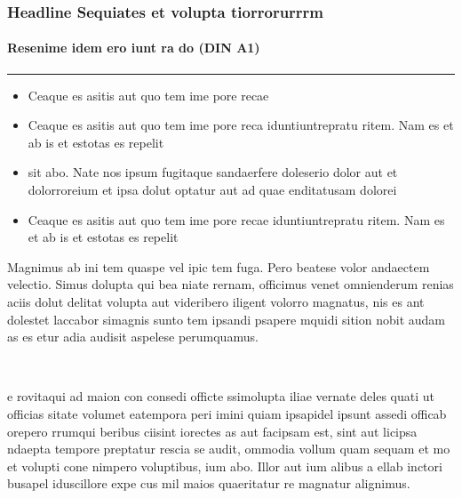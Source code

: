 \documentclass{beamer}
\begin{document}
\begin{frame}[t]

  \frametitle{\vspace*{1cm}Headline Sequiates et volupta tiorrorurrrm}
  \framesubtitle{Resenime idem ero iunt ra do (DIN A1)}

  \begin{appendixblock}
    \begin{minipage}[c]{.48\linewidth}
      \centering
      \color{fzjblue}\rule{0.9\linewidth}{0.2\paperheight}
    \end{minipage}
    \hfill
    \begin{minipage}[c]{.48\linewidth}
      \begin{itemize}
      \item Ceaque es asitis aut quo tem ime pore recae
      \item Ceaque es asitis aut quo tem ime pore reca
        iduntiuntrepratu ritem. Nam es et ab is et estotas es repelit
      \item sit abo. Nate nos ipsum fugitaque sandaerfere doleserio
        dolor aut et dolorroreium et ipsa dolut optatur aut ad quae
        enditatusam dolorei
      \item Ceaque es asitis aut quo tem ime pore recae
        iduntiuntrepratu ritem. Nam es et ab is et estotas es repelit
      \end{itemize}
    \end{minipage}
  \end{appendixblock}

  Magnimus ab ini tem quaspe vel ipic tem fuga. Pero beatese volor
  andaectem velectio. Simus dolupta qui bea niate rernam, officimus
  venet omnienderum renias aciis dolut delitat volupta aut videribero
  iligent volorro magnatus, nis es ant dolestet laccabor simagnis
  sunto tem ipsandi psapere mquidi sition nobit audam as es etur adia
  audisit aspelese perumquamus.\\[1.5ex]

  \begin{columns}[onlytextwidth]
    \begin{column}{.49\linewidth}
      \textbf{}\\
      e rovitaqui ad maion con consedi officte ssimolupta iliae
      vernate deles quati ut officias sitate volumet eatempora peri
      imini quiam ipsapidel ipsunt assedi officab orepero rrumqui
      beribus ciisint iorectes as aut facipsam est, sint aut licipsa
      ndaepta tempore preptatur rescia se audit, ommodia vollum quam
      sequam et mo et volupti cone nimpero voluptibus, ium abo. Illor
      aut ium alibus a ellab inctori busapel iduscillore expe cus mil
      maios quaeritatur re magnatur alignimus.\\[1ex]


\end{column}
\end{columns}
\end{frame}
\end{document}
